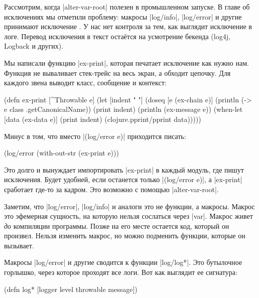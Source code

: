 \label{install-logger}

Рассмотрим, когда \spverb|alter-var-root| полезен в промышленном запуске. В
главе об исключениях мы отметили проблему: макросы \spverb|log/info|,
\spverb|log/error| и другие принимают исключение . У нас нет
контроля за тем, как выглядит исключение в логе. Перевод исключения в текст
оста\"{е}тся на усмотрение бекенда (log4j, Logback и других).

Мы написали функцию \spverb|ex-print|, которая печатает исключение как нужно
нам. Функция не вываливает стек-трейс на весь экран, а обходит цепочку. Для
каждого звена выводит класс, сообщение и контекст:

\begin{english}
  \begin{clojure}
(defn ex-print
  [^Throwable e]
  (let [indent "  "]
    (doseq [e (ex-chain e)]
      (println (-> e class .getCanonicalName))
      (print indent)
      (println (ex-message e))
      (when-let [data (ex-data e)]
        (print indent)
        (clojure.pprint/pprint data)))))
  \end{clojure}
\end{english}

\noindent
Минус в том, что вместо \spverb|(log/error e)| приходится писать:

\begin{english}
  \begin{clojure}
(log/error (with-out-str (ex-print e)))
  \end{clojure}
\end{english}

\noindent
Это долго и вынуждает импортировать \spverb|ex-print| в каждый модуль, где пишут
исключения. Будет удобней, если останется только \spverb|(log/error e)|, а
\spverb|ex-print| сработает где-то за кадром. Это возможно с помощью
\spverb|alter-var-root|.

Заметим, что \spverb|log/error|, \spverb|log/info| и аналоги это не функции, а
макросы. Макрос это эфемерная сущность, на которую нельзя сослаться через
\spverb|var|. Макрос живет \emph{до} компиляции программы. Позже на его месте
остается код, который он произвел. Нельзя изменить макрос, но можно подменить
функции, которые он вызывает.

Макросы \spverb|log/error| и другие сводится к функции \spverb|log/log*|. Это
бутылочное горлышко, через которое проходят все логи. Вот как выглядит ее
сигнатура:

\begin{english}
  \begin{clojure}
(defn log* [logger level throwable message])
  \end{clojure}
\end{english}

